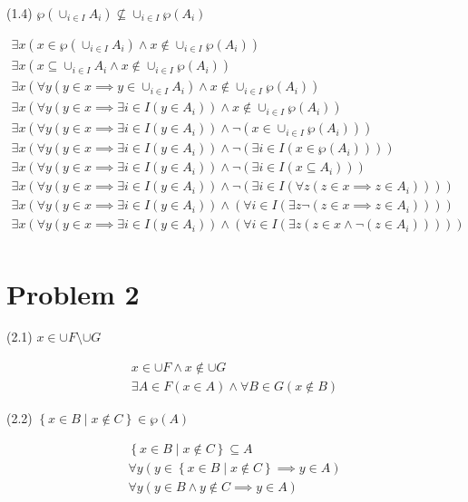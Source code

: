 \documentclass{article}
\begin{document}
\begin{center}
(1.4) $\wp(\cup_{i \in I} A_i) \nsubseteq \cup_{i \in I} \wp(A_i)$
\end{center}
\begin{align*}
\exists x(x \in \wp(\cup_{i \in I} A_i) \land x \notin \cup_{i \in I} \wp(A_i)) \\
\exists x(x \subseteq \cup_{i \in I} A_i \land x \notin \cup_{i \in I} \wp(A_i)) \\
\exists x( \forall y (y \in x \implies y \in \cup_{i \in I} A_i) \land
x \notin \cup_{i \in I} \wp(A_i)) \\
\exists x( \forall y (y \in x \implies \exists i \in I(y \in A_i))
\land x \notin \cup_{i \in I} \wp(A_i)) \\
\exists x( \forall y (y \in x \implies \exists i \in I(y \in A_i))
\land \neg (x \in \cup_{i \in I} \wp(A_i))) \\
\exists x( \forall y (y \in x \implies \exists i \in I(y \in A_i))
\land \neg (\exists i \in I(x \in \wp(A_i)))) \\
\exists x( \forall y (y \in x \implies \exists i \in I(y \in A_i))
\land \neg (\exists i \in I(x \subseteq A_i))) \\
\exists x( \forall y (y \in x \implies \exists i \in I(y \in A_i))
\land \neg (\exists i \in I(\forall z (z \in x \implies z \in A_i)))) \\
\exists x( \forall y (y \in x \implies \exists i \in I(y \in A_i))
\land (\forall i \in I(\exists z \neg(z \in x \implies z \in A_i)))) \\
\exists x( \forall y (y \in x \implies \exists i \in I(y \in A_i))
\land (\forall i \in I(\exists z (z \in x \land \neg(z \in A_i))))) \\
\end{align*}

\section{Problem 2}
\begin{center}
(2.1) $x \in \cup F \setminus \cup G $
\end{center}
\begin{align*}
x \in \cup F \land x \notin \cup G \\
\exists A \in F(x \in A) \land \forall B \in G(x \notin B)
\end{align*}

\begin{center}
(2.2) $\left\{ x \in B \mid x \notin C\right\} \in \wp(A)$ 
\end{center}
\begin{align*}
\left\{ x \in B \mid x \notin C\right\} \subseteq A  \\
\forall y(y \in \left\{ x \in B \mid x \notin C\right\} \implies y \in A) \\
\forall y(y \in  B \land y \notin C \implies y \in A) \\
\end{align*}
\end{document}
